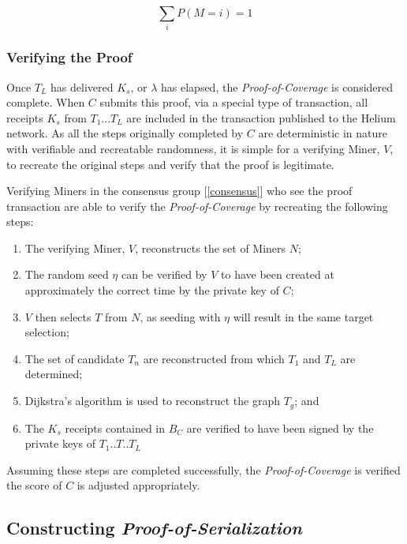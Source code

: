 \documentclass[10pt, nonatbib, nocopyrightspace, reprint]{sigplanconf}
\newcommand{\secref}[1]{[\autoref{#1}]}
\begin{document}
\begin{equation*} \label{eq:discrete-probability-distribution}
        \sum_i P(M=i) = 1
\end{equation*}


\subsubsection{Verifying the Proof}

Once $T_L$ has delivered $K_s$, or $\lambda$ has elapsed, the \emph{Proof-of-Coverage} is considered complete. When $C$ submits this proof, via a special type of transaction, all receipts $K_s$ from $T_1$...$T_L$ are included in the transaction published to the Helium network. As all the steps originally completed by $C$ are deterministic in nature with verifiable and recreatable randomness, it is simple for a verifying Miner, $V$, to recreate the original steps and verify that the proof is legitimate.

Verifying Miners in the consensus group \secref{consensus} who see the proof transaction are able to verify the \emph{Proof-of-Coverage} by recreating the following steps:

\begin{enumerate}
        \item The verifying Miner, $V$, reconstructs the set of Miners $N$;
        \item The random seed $\eta$ can be verified by $V$ to have been created at approximately the correct time by the private key of $C$;
        \item $V$ then selects $T$ from $N$, as seeding with $\eta$ will result in the same target selection;
        \item The set of candidate $T_n$ are reconstructed from which $T_1$ and $T_L$ are determined;
        \item Dijkstra's algorithm is used to reconstruct the graph $T_g$; and
        \item The $K_s$ receipts contained in $B_C$ are verified to have been signed by the private keys of $T_1$..$T$..$T_L$
\end{enumerate}

Assuming these steps are completed successfully, the \emph{Proof-of-Coverage} is verified the score of $C$ is adjusted appropriately.

\subsection{Constructing \emph{Proof-of-Serialization}}
\end{document}
